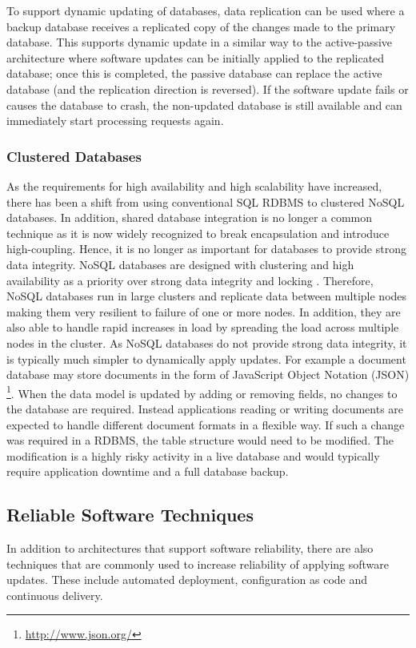 \documentclass[a4paper,11pt,twoside]{article}
\begin{document}
To support dynamic updating of databases, data replication can be used where a backup database receives a replicated copy of the changes made to the primary database. This supports dynamic update in a similar way to the active-passive architecture where software updates can be initially applied to the replicated database; once this is completed, the passive database can replace the active database (and the replication direction is reversed). If the software update fails or causes the database to crash, the non-updated database is still available and can immediately start processing requests again.

\subsubsection{Clustered Databases}
As the requirements for high availability and high scalability have increased, there has been a shift from using conventional SQL RDBMS to clustered NoSQL databases. In addition, shared database integration is no longer a common technique as it is now widely recognized to break encapsulation and introduce high-coupling. Hence, it is no longer as important for databases to provide strong data integrity. NoSQL databases are designed with clustering and high availability as a priority over strong data integrity and locking \cite{NoSQL}. Therefore, NoSQL databases run in large clusters and replicate data between multiple nodes making them very resilient to failure of one or more nodes. In addition, they are also able to handle rapid increases in load by spreading the load across multiple nodes in the cluster. As NoSQL databases do not provide strong data integrity, it is typically much simpler to dynamically apply updates. For example a document database may store documents in the form of JavaScript Object Notation (JSON) \footnote{\url{http://www.json.org/}}. When the data model is updated by adding or removing fields, no changes to the database are required. Instead applications reading or writing documents are expected to handle different document formats in a flexible way. If such a change was required in a RDBMS, the table structure would need to be modified. The modification is a highly risky activity in a live database and would typically require application downtime and a full database backup.

\subsection{Reliable Software Techniques}
In addition to architectures that support software reliability, there are also techniques that are commonly used to increase reliability of applying software updates. These include automated deployment, configuration as code and continuous delivery.
\end{document}
